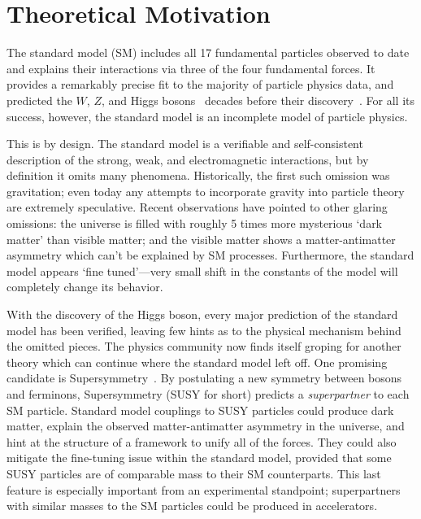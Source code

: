 \chapter{Theoretical Motivation}

The standard model (SM) includes all 17 fundamental particles observed to date and explains their interactions via three of the four fundamental forces.
It provides a remarkably precise fit to the majority of particle physics data, and predicted the $W$, $Z$, and Higgs bosons~\cite{wzmass1,higgs1,higgs2} decades before their discovery~\cite{ua1w,ua2w,ua1z,ua2z,atlashiggs,cmshiggs}.
For all its success, however, the standard model is an incomplete model of particle physics.

This is by design. The standard model is a verifiable and self-consistent description of the strong, weak, and electromagnetic interactions, but by definition it omits many phenomena.
Historically, the first such omission was gravitation; even today any attempts to incorporate gravity into particle theory are extremely speculative.
Recent observations have pointed to other glaring omissions:
the universe is filled with roughly 5 times more mysterious `dark matter' than visible matter;
and the visible matter shows a matter-antimatter asymmetry which can't be explained by SM processes.
Furthermore, the standard model appears `fine tuned'---very small shift in the constants of the model will completely change its behavior.

With the discovery of the Higgs boson, every major prediction of the standard model has been verified, leaving few hints as to the physical mechanism behind the omitted pieces.
The physics community now finds itself groping for another theory which can continue where the standard model left off. One promising candidate is Supersymmetry~\cite{susyprimer,srednicki,pdg2014}.
By postulating a new symmetry between bosons and ferminons, Supersymmetry (SUSY for short) predicts a \emph{superpartner} to each SM particle. Standard model couplings to SUSY particles could produce dark matter, explain the observed matter-antimatter asymmetry in the universe, and hint at the structure of a framework to unify all of the forces.
They could also mitigate the fine-tuning issue within the standard model, provided that some SUSY particles are of comparable mass to their SM counterparts. This last feature is especially important from an experimental standpoint; superpartners with similar masses to the SM particles could be produced in accelerators.

